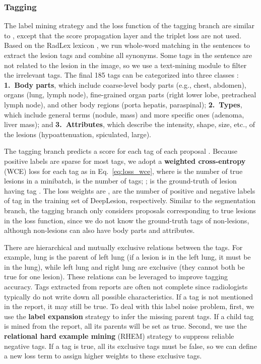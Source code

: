 \documentclass[runningheads]{llncs}
\def\Eq#1{{Eq.\ \ref{eq:#1}}}
\begin{document}
\subsubsection{Tagging}

The label mining strategy and the loss function of the tagging branch are similar to \cite{Yan2019Lesa}, except that the score propagation layer and the triplet loss are not used. Based on the RadLex lexicon \cite{Langlotz2006RadLex}, we run whole-word matching in the sentences to extract the lesion tags and combine all synonyms. Some tags in the sentence are not related to the lesion in the image, so we use a text-mining module \cite{Yan2019Lesa} to filter the irrelevant tags. The final 185 tags can be categorized into three classes \cite{Yan2019Lesa}: {\bf 1.\ Body parts}, which include coarse-level body parts (e.g., chest, abdomen), organs (lung, lymph node), fine-grained organ parts (right lower lobe, pretracheal lymph node), and other body regions (porta hepatis, paraspinal); {\bf 2.\ Types}, which include general terms (nodule, mass) and more specific ones (adenoma, liver mass); and {\bf 3.\ Attributes}, which describe the intensity, shape, size, etc., of the lesions (hypoattenuation, spiculated, large).

The tagging branch predicts a score  for each tag  of each proposal . Because positive labels are sparse for most tags, we adopt a \textbf{weighted cross-entropy} (WCE) loss \cite{Yan2019Lesa} for each tag as in \Eq{loss_wce}, where  is the number of true lesions in a minibatch,  is the number of tags; ;  is the ground-truth of lesion  having tag . The loss weights are ,  are the number of positive and negative labels of tag  in the training set of DeepLesion, respectively. Similar to the segmentation branch, the tagging branch only considers proposals corresponding to true lesions in the loss function, since we do not know the ground-truth tags of non-lesions, although non-lesions can also have body parts and attributes.


There are hierarchical and mutually exclusive relations between the tags. For example, lung is the parent of left lung (if a lesion is in the left lung, it must be in the lung), while left lung and right lung are exclusive (they cannot both be true for one lesion). These relations can be leveraged to improve tagging accuracy. Tags extracted from reports are often not complete since radiologists typically do not write down all possible characteristics. If a tag is not mentioned in the report, it may still be true. To deal with this label noise problem, first, we use the \textbf{label expansion} strategy \cite{Yan2019Lesa} to infer the missing parent tags. If a child tag is mined from the report, all its parents will be set as true. Second, we use the \textbf{relational hard example mining} (RHEM) strategy \cite{Yan2019Lesa} to suppress reliable negative tags. If a tag is true, all its exclusive tags must be false, so we can define a new loss term  to assign higher weights to these exclusive tags.
\end{document}
